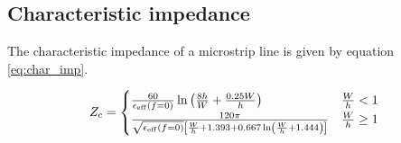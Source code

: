 \subsection{Characteristic impedance}
The characteristic impedance of a microstrip line is given by equation \ref{eq:char_imp}.

\begin{equation}
Z_{\rm c} =
\begin{cases}
\frac{60}{\epsilon_{\rm eff}(f=0)} \ln \left( \frac{8h}{W} + \frac{0.25W}{h} \right) & \frac{W}{h} < 1\\
\frac{120 \pi}{\sqrt{\epsilon_{\rm eff}(f=0)} \left[ \frac{W}{h} + 1.393 + 0.667 \ln \left( \frac{W}{h} + 1.444 \right) \right]} & \frac{W}{h} \geq 1
\end{cases}
\label{eq:char_imp}
\end{equation}